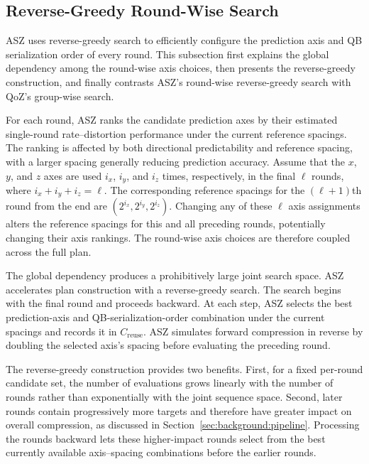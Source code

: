 \subsection{Reverse-Greedy Round-Wise Search}
\label{sec:configuration-space:reverse-greedy}

ASZ uses reverse-greedy search to efficiently configure the prediction axis and QB serialization order of every round. This subsection first explains the global dependency among the round-wise axis choices, then presents the reverse-greedy construction, and finally contrasts ASZ's round-wise reverse-greedy search with QoZ's group-wise search.

For each round, ASZ ranks the candidate prediction axes by their estimated single-round rate--distortion performance under the current reference spacings. The ranking is affected by both directional predictability and reference spacing, with a larger spacing generally reducing prediction accuracy. Assume that the $x$, $y$, and $z$ axes are used $i_x$, $i_y$, and $i_z$ times, respectively, in the final $\ell$ rounds, where $i_x+i_y+i_z=\ell$. The corresponding reference spacings for the $(\ell+1)$th round from the end are $(2^{i_x},2^{i_y},2^{i_z})$. Changing any of these $\ell$ axis assignments alters the reference spacings for this and all preceding rounds, potentially changing their axis rankings. The round-wise axis choices are therefore coupled across the full plan.

The global dependency produces a prohibitively large joint search space. ASZ accelerates plan construction with a reverse-greedy search. The search begins with the final round and proceeds backward. At each step, ASZ selects the best prediction-axis and QB-serialization-order combination under the current spacings and records it in $C_{\mathrm{reuse}}$. ASZ simulates forward compression in reverse by doubling the selected axis's spacing before evaluating the preceding round.

The reverse-greedy construction provides two benefits. First, for a fixed per-round candidate set, the number of evaluations grows linearly with the number of rounds rather than exponentially with the joint sequence space. Second, later rounds contain progressively more targets and therefore have greater impact on overall compression, as discussed in Section~\ref{sec:background:pipeline}. Processing the rounds backward lets these higher-impact rounds select from the best currently available axis--spacing combinations before the earlier rounds.


